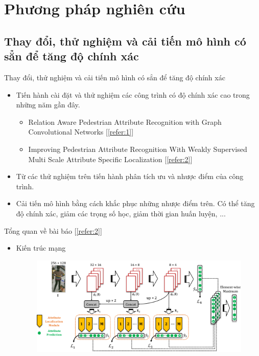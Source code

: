 \section{Phương pháp nghiên cứu}\label{sec:intro}
\frame{\tableofcontents[currentsection]}
\subsection{Thay đổi, thử nghiệm và cải tiến mô hình có sẳn để tăng độ chính xác}
\begin{frame}{Thay đổi, thử nghiệm và cải tiến mô hình có sẳn để tăng độ chính xác}

\begin{itemize}
    \item Tiến hành cài đặt và thử nghiệm các công trình có độ chính xác cao trong những năm gần đây.
    \begin{itemize}
        \item Relation Aware Pedestrian Attribute Recognition with Graph Convolutional Networks [\ref{refer:1}]
        \item Improving Pedestrian Attribute Recognition With Weakly Supervised Multi Scale Attribute Specific Localization [\ref{refer:2}]
    \end{itemize}
    \item Từ các thử nghiệm trên tiến hành phân tích ưu và nhược điểm của công trình.
    \item Cải tiến mô hình bằng cách khắc phục những nhược điểm trên. Có thể tăng độ chính xác, giảm các trọng số học, giảm thời gian huấn luyện, ...
\end{itemize}
\end{frame}

\begin{frame}{Tổng quan về bài báo [\ref{refer:2}]}
\begin{itemize}
    \item Kiến trúc mạng
    \begin{figure}[H]
    \centering
    \includegraphics[width=12cm]{images/model_ALM.png}
    \label{fig:model_ALM}
    \end{figure}
\end{itemize}
\end{frame}

